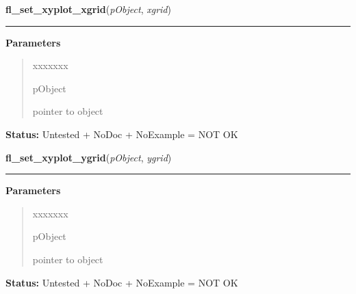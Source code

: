 \hspace{.8\funcindent}\begin{boxedminipage}{\funcwidth}

    \raggedright \textbf{fl\_set\_xyplot\_xgrid}(\textit{pObject}, \textit{xgrid})

    \vspace{-1.5ex}

    \rule{\textwidth}{0.5\fboxrule}
\setlength{\parskip}{2ex}
\setlength{\parskip}{1ex}
      \textbf{Parameters}
      \vspace{-1ex}

      \begin{quote}
        \begin{Ventry}{xxxxxxx}

          \item[pObject]

          pointer to object

        \end{Ventry}

      \end{quote}

\textbf{Status:} Untested + NoDoc + NoExample = NOT OK



    \end{boxedminipage}

    \label{xformslib:library:fl_set_xyplot_ygrid}

    \vspace{0.5ex}

\hspace{.8\funcindent}\begin{boxedminipage}{\funcwidth}

    \raggedright \textbf{fl\_set\_xyplot\_ygrid}(\textit{pObject}, \textit{ygrid})

    \vspace{-1.5ex}

    \rule{\textwidth}{0.5\fboxrule}
\setlength{\parskip}{2ex}
\setlength{\parskip}{1ex}
      \textbf{Parameters}
      \vspace{-1ex}

      \begin{quote}
        \begin{Ventry}{xxxxxxx}

          \item[pObject]

          pointer to object

        \end{Ventry}

      \end{quote}

\textbf{Status:} Untested + NoDoc + NoExample = NOT OK



    \end{boxedminipage}

